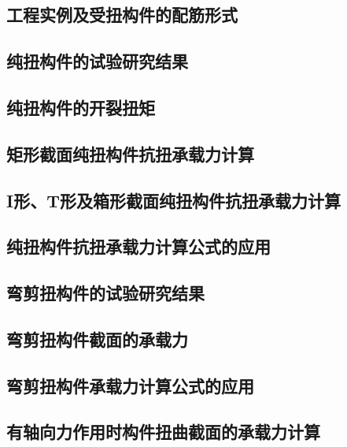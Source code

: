 \documentclass{article}
\begin{document}
\subsection{工程实例及受扭构件的配筋形式}
\subsection{纯扭构件的试验研究结果}
\subsection{纯扭构件的开裂扭矩}
\subsection{矩形截面纯扭构件抗扭承载力计算}
\subsection{I形、T形及箱形截面纯扭构件抗扭承载力计算}
\subsection{纯扭构件抗扭承载力计算公式的应用}
\subsection{弯剪扭构件的试验研究结果}
\subsection{弯剪扭构件截面的承载力}
\subsection{弯剪扭构件承载力计算公式的应用}
\subsection{有轴向力作用时构件扭曲截面的承载力计算}
\appendix
\newpage
\newcommand{\ans}{\par \noindent \textbf{答：}}
\end{document}
